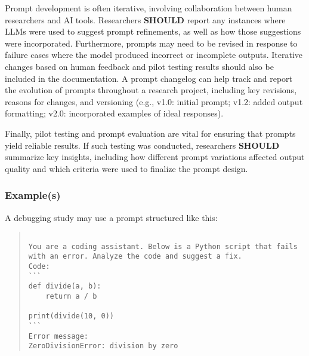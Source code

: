 Prompt development is often iterative, involving collaboration between human researchers and AI tools. Researchers \textbf{SHOULD} report any instances where LLMs were used to suggest prompt refinements, as well as how those suggestions were incorporated. Furthermore, prompts may need to be revised in response to failure cases where the model produced incorrect or incomplete outputs. Iterative changes based on human feedback and pilot testing results should also be included in the documentation. A prompt changelog can help track and report the evolution of prompts throughout a research project, including key revisions, reasons for changes, and versioning (e.g., v1.0: initial prompt; v1.2: added output formatting; v2.0: incorporated examples of ideal responses).

Finally, pilot testing and prompt evaluation are vital for ensuring that prompts yield reliable results. If such testing was conducted, researchers \textbf{SHOULD} summarize key insights, including how different prompt variations affected output quality and which criteria were used to finalize the prompt design.


\subsubsection{Example(s)}
A debugging study may use a prompt structured like this:


\begin{quote}
\begin{verbatim}

You are a coding assistant. Below is a Python script that fails with an error. Analyze the code and suggest a fix.
Code:
```
def divide(a, b):
    return a / b

print(divide(10, 0))
```
Error message:
ZeroDivisionError: division by zero

\end{verbatim}
\end{quote}

